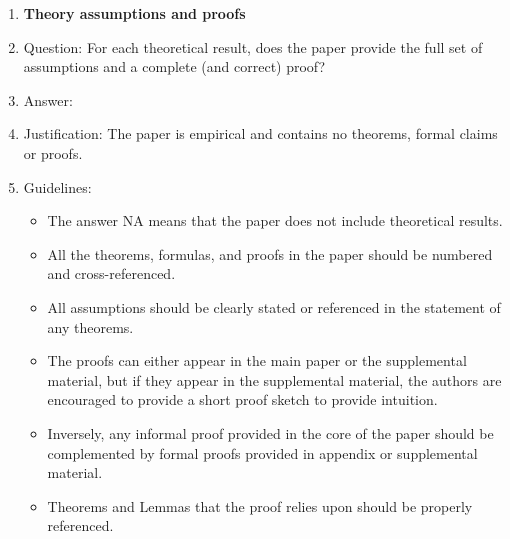 \begin{enumerate}
\item {\bf Theory assumptions and proofs}
    \item[] Question: For each theoretical result, does the paper provide the full set of assumptions and a complete (and correct) proof?
    \item[] Answer: \answerNA{}
    \item[] Justification: The paper is empirical and contains no theorems, formal claims or proofs.
    \item[] Guidelines:
    \begin{itemize}
        \item The answer NA means that the paper does not include theoretical results.
        \item All the theorems, formulas, and proofs in the paper should be numbered and cross-referenced.
        \item All assumptions should be clearly stated or referenced in the statement of any theorems.
        \item The proofs can either appear in the main paper or the supplemental material, but if they appear in the supplemental material, the authors are encouraged to provide a short proof sketch to provide intuition.
        \item Inversely, any informal proof provided in the core of the paper should be complemented by formal proofs provided in appendix or supplemental material.
        \item Theorems and Lemmas that the proof relies upon should be properly referenced.
    \end{itemize}


\end{enumerate}
